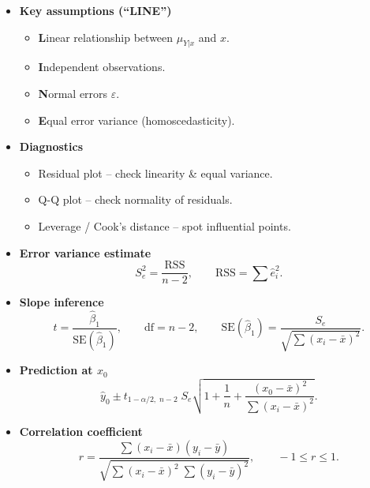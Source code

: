 \documentclass[12pt]{book}
\begin{document}
\begin{itemize}
  \item \textbf{Key assumptions (“LINE”)}
        \begin{itemize}
          \item \textbf{L}inear relationship between \(\mu_{Y|x}\) and \(x\).
          \item \textbf{I}ndependent observations.
          \item \textbf{N}ormal errors \(\varepsilon\).
          \item \textbf{E}qual error variance (homoscedasticity).
        \end{itemize}

  \item \textbf{Diagnostics}
        \begin{itemize}
          \item Residual plot – check linearity \& equal variance.
          \item Q-Q plot – check normality of residuals.
          \item Leverage / Cook’s distance – spot influential points.
        \end{itemize}

  \item \textbf{Error variance estimate}
        \[
          S^{2}_{e}=\frac{\text{RSS}}{n-2},
          \qquad
          \text{RSS}=\sum\hat{e}_{i}^{2}.
        \]

  \item \textbf{Slope inference}
        \[
          t=\frac{\hat{\beta}_{1}}{\text{SE}(\hat{\beta}_{1})},
          \qquad
          \text{df}=n-2,
          \qquad
          \text{SE}(\hat{\beta}_{1})=
          \frac{S_{e}}{\sqrt{\sum(x_{i}-\bar{x})^{2}}}.
        \]

  \item \textbf{Prediction at \(x_{0}\)}
        \[
          \hat{y}_{0}\pm
          t_{1-\alpha/2,\;n-2}\;
          S_{e}\sqrt{1+\frac{1}{n}+
            \frac{(x_{0}-\bar{x})^{2}}{\sum(x_{i}-\bar{x})^{2}}}.
        \]

  \item \textbf{Correlation coefficient}
        \[
          r=\frac{\sum(x_{i}-\bar{x})(y_{i}-\bar{y})}{
                \sqrt{\sum(x_{i}-\bar{x})^{2}\;
                      \sum(y_{i}-\bar{y})^{2}}}, 
          \qquad -1\le r\le 1.
        \]


\end{itemize}
\end{document}
